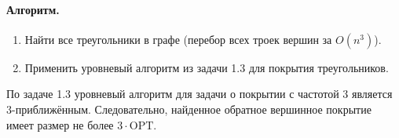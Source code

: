 \documentclass[12pt]{article}
\begin{document}
  \paragraph{Алгоритм.}
  \begin{enumerate}
    \item Найти все треугольники в графе (перебор всех троек вершин за \(O(n^3)\)).
    \item Применить уровневый алгоритм из задачи 1.3 для покрытия треугольников.
  \end{enumerate}

  По задаче 1.3 уровневый алгоритм для задачи о покрытии с частотой 3 является 3-приближённым. Следовательно, найденное обратное вершинное покрытие имеет размер не более \(3 \cdot \text{OPT}\).
\end{document}
